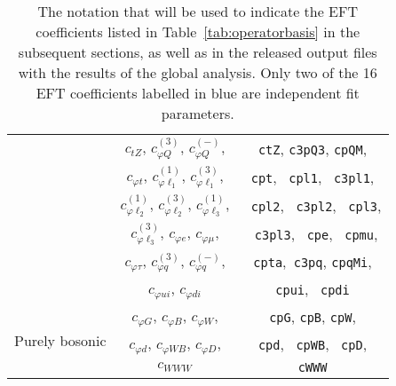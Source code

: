 \begin{table}[htbp]
\begin{center}
\begin{tabular}{ccc}
          &    $c_{tZ}$,  $c_{\varphi Q}^{(3)}$, $c_{\varphi Q}^{(-)}$,
          &    {\tt ctZ}, {\tt c3pQ3}, {\tt cpQM},            \\
          &     $c_{\varphi t}$, $c_{\varphi \ell_1}^{(1)}$, $c_{\varphi \ell_1}^{(3)}$,
          &     {\tt cpt}, {\tt \color{blue} cpl1},  {\tt \color{blue} c3pl1},          \\
          &   $c_{\varphi \ell_2}^{(1)}$, $c_{\varphi \ell_2}^{(3)}$, $c_{\varphi \ell_3}^{(1)}$,
          &  {\tt \color{blue} cpl2}, {\tt \color{blue} c3pl2},  {\tt \color{blue} cpl3},         \\
          &   $c_{\varphi \ell_3}^{(3)}$, $c_{\varphi e}$, $c_{\varphi \mu}$,
          &  {\tt \color{blue} c3pl3}, {\tt \color{blue} cpe},   {\tt \color{blue} cpmu},    \\
          &  $c_{\varphi \tau}$, $c_{\varphi q}^{(3)}$, $c_{\varphi q}^{(-)}$, 
          &     {\tt \color{blue}cpta},{\tt \color{blue} c3pq}, {\tt \color{blue}cpqMi},          \\
          &     ${ {c_{\varphi u i}}}$,
        ${ {c_{\varphi d i}}}$
          &     {\tt \color{blue}cpui}, {\tt \color{blue} cpdi}           \\
       \midrule
       \multirow{3}{*}{Purely bosonic}      & $c_{\varphi G}$, $c_{\varphi B}$, $c_{\varphi W}$,
                                            &   {\tt cpG}, {\tt cpB}, {\tt cpW}, \\
       &   $c_{\varphi d}$, $c_{\varphi W B}$, $c_{\varphi D}$,
       &   {\tt cpd}, {\tt \color{blue} cpWB}, {\tt \color{blue} cpD}, \\    
       &  $c_{WWW}$
       &    {\tt   cWWW}  \\
         \bottomrule
  \end{tabular}
        \caption{The notation that will be used to indicate the EFT coefficients
          listed in  Table~\ref{tab:operatorbasis} in the
          subsequent sections, as well as in the released output files
          with the results of the global analysis.
Only two of the 16 EFT coefficients labelled in blue are independent fit parameters.
\label{tab:notation_coeffs}}
\end{center}
\end{table}
